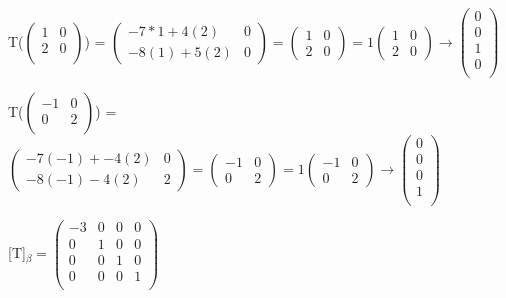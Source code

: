 \documentclass[12pt]{article}
\begin{document}
\begin{enumerate}
    T($\begin{pmatrix}
        1 & 0 \\
        2 & 0 \\
    \end{pmatrix}$) = $\begin{pmatrix}
        -7*1 + 4(2) & 0 \\
        -8(1) + 5(2) & 0
    \end{pmatrix} = \begin{pmatrix}
        1 & 0 \\
        2 & 0
    \end{pmatrix} = 1\begin{pmatrix}
        1 & 0 \\
        2 & 0
    \end{pmatrix} \rightarrow \begin{pmatrix}
        0 \\
        0 \\
        1\\
        0\\
    \end{pmatrix}$

    T($\begin{pmatrix}
        -1 & 0 \\
        0 & 2 \\
    \end{pmatrix}$) = $\begin{pmatrix}
        -7(-1) + -4(2)  & 0 \\
        -8(-1) - 4(2) & 2
    \end{pmatrix} = \begin{pmatrix}
        -1 & 0 \\
        0 & 2
    \end{pmatrix} = 1\begin{pmatrix}
        -1 & 0 \\
        0 & 2
    \end{pmatrix} \rightarrow \begin{pmatrix}
        0 \\
        0 \\
        0\\
        1\\
    \end{pmatrix}$ 

    [T]$_\beta = \begin{pmatrix}
        -3 & 0 & 0 & 0 \\
        0 & 1 & 0 & 0 \\
        0 & 0 & 1 & 0 \\
        0 & 0 & 0 & 1\\
    \end{pmatrix}$


\end{enumerate}
\end{document}

